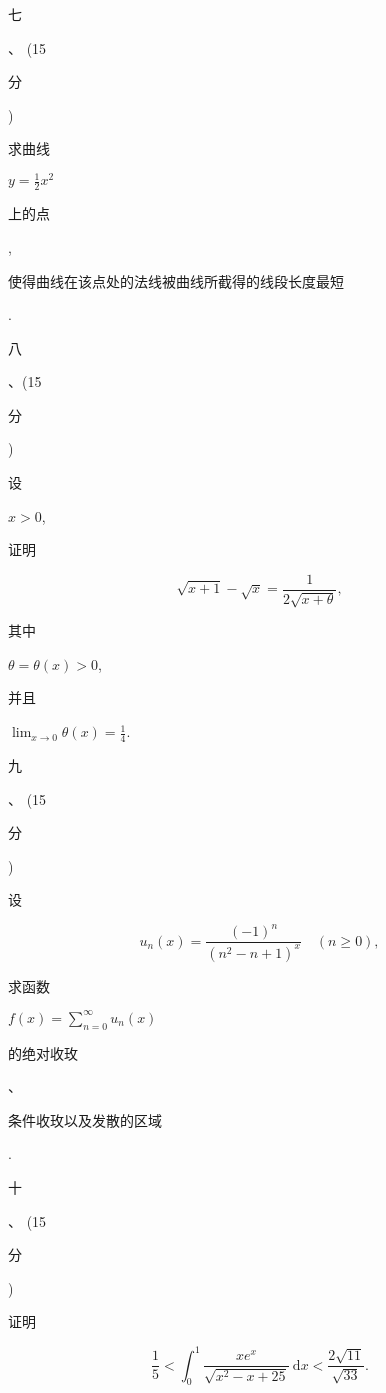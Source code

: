 \documentclass[10pt]{article}
\begin{document}
\begin{CJK}{UTF8}{mj}七\end{CJK}、 (15 \begin{CJK}{UTF8}{mj}分\end{CJK}) \begin{CJK}{UTF8}{mj}求曲线\end{CJK} $y=\frac{1}{2} x^{2}$ \begin{CJK}{UTF8}{mj}上的点\end{CJK}, \begin{CJK}{UTF8}{mj}使得曲线在该点处的法线被曲线所截得的线段长度最短\end{CJK}.

\begin{CJK}{UTF8}{mj}八\end{CJK}、(15 \begin{CJK}{UTF8}{mj}分\end{CJK}) \begin{CJK}{UTF8}{mj}设\end{CJK} $x>0$, \begin{CJK}{UTF8}{mj}证明\end{CJK}
$$
\sqrt{x+1}-\sqrt{x}=\frac{1}{2 \sqrt{x+\theta}},
$$
\begin{CJK}{UTF8}{mj}其中\end{CJK} $\theta=\theta(x)>0$, \begin{CJK}{UTF8}{mj}并且\end{CJK} $\lim _{x \rightarrow 0} \theta(x)=\frac{1}{4}$.

\begin{CJK}{UTF8}{mj}九\end{CJK}、 (15 \begin{CJK}{UTF8}{mj}分\end{CJK}) \begin{CJK}{UTF8}{mj}设\end{CJK}
$$
u_{n}(x)=\frac{(-1)^{n}}{\left(n^{2}-n+1\right)^{x}} \quad(n \geq 0),
$$
\begin{CJK}{UTF8}{mj}求函数\end{CJK} $f(x)=\sum_{n=0}^{\infty} u_{n}(x)$ \begin{CJK}{UTF8}{mj}的绝对收玫\end{CJK}、\begin{CJK}{UTF8}{mj}条件收玫以及发散的区域\end{CJK}.

\begin{CJK}{UTF8}{mj}十\end{CJK}、 (15 \begin{CJK}{UTF8}{mj}分\end{CJK}) \begin{CJK}{UTF8}{mj}证明\end{CJK}
$$
\frac{1}{5}<\int_{0}^{1} \frac{x e^{x}}{\sqrt{x^{2}-x+25}} \mathrm{~d} x<\frac{2 \sqrt{11}}{\sqrt{33}} .
$$
\end{document}
